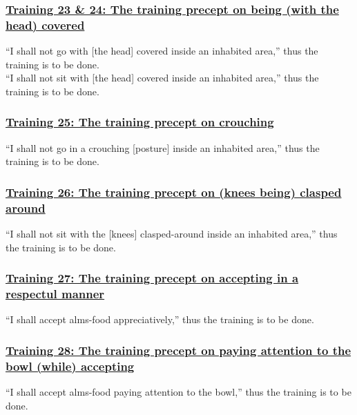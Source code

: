 \subsubsection*{\hyperref[sekh23-24]{Training 23 \& 24: The training precept on being (with the head) covered}}
\label{training23-24}
``I shall not go with [the head] covered inside an inhabited area,'' thus the training is to be done.\\
``I shall not sit with [the head] covered inside an inhabited area,'' thus the training is to be done.



\subsubsection*{\hyperref[sekh25]{Training 25: The training precept on crouching}}
\label{training25}
``I shall not go in a crouching [posture] inside an inhabited area,'' thus the training is to be done.



\subsubsection*{\hyperref[sekh26]{Training 26: The training precept on (knees being) clasped around}}
\label{training26}
``I shall not sit with the [knees] clasped-around inside an inhabited area,'' thus the training is to be done.



\subsubsection*{\hyperref[sekh27]{Training 27: The training precept on accepting in a respectul manner}}
\label{training27}
``I shall accept alms-food appreciatively,'' thus the training is to be done.



\subsubsection*{\hyperref[sekh28]{Training 28: The training precept on paying attention to the bowl (while) accepting}}
\label{training28}
``I shall accept alms-food paying attention to the bowl,'' thus the training is to be done.



